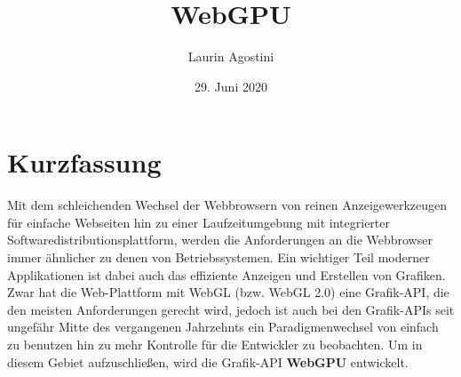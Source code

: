 \documentclass[oneside]{ausarbeitung}
\newcommand*{\quotize}[1]{\glqq #1\grqq}
\begin{document}



\title{WebGPU}

\author{Laurin Agostini}

\date{29. Juni 2020}

\maketitle
\cleardoublepage

\setcounter{page}{1}


\makeaffirmation
\cleardoublepage

\chapter*{Kurzfassung}
Mit dem schleichenden Wechsel der Webbrowsern von reinen Anzeigewerkzeugen für einfache Webseiten hin zu einer Laufzeitumgebung mit integrierter Softwaredistributionsplattform, werden die Anforderungen an die Webbrowser immer ähnlicher zu denen von Betriebssystemen. Ein wichtiger Teil moderner Applikationen ist dabei auch das effiziente Anzeigen und Erstellen von Grafiken. Zwar hat die Web-Plattform mit WebGL (bzw. WebGL 2.0) eine Grafik-API, die den meisten Anforderungen gerecht wird, jedoch ist auch bei den Grafik-APIs seit ungefähr Mitte des vergangenen Jahrzehnts ein Paradigmenwechsel von \quotize{einfach zu benutzen} hin zu \quotize{mehr Kontrolle für die Entwickler} zu beobachten. Um in diesem Gebiet aufzuschließen, wird die Grafik-API \textbf{WebGPU} entwickelt.
\end{document}
